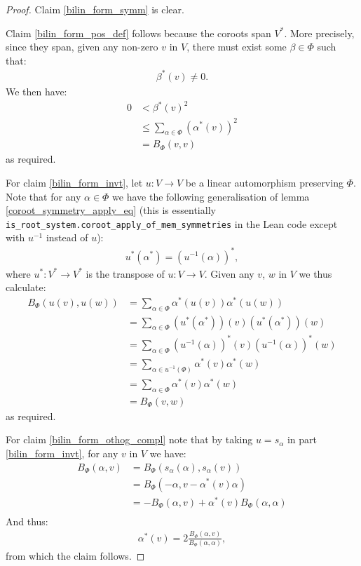 \documentclass[12pt, a4paper]{article}
\begin{document}
\begin{proof}
  Claim \eqref{bilin_form_symm} is clear.

  Claim \eqref{bilin_form_pos_def} follows because the coroots span $V^*$. More precisely, since
  they span, given any non-zero $v$ in $V$, there must exist some $\beta \in \Phi$ such that:
  \begin{align*}
    \beta^*(v) \ne 0.
  \end{align*}
  We then have:
  \begin{align*}
    0 &< \beta^*(v)^2\\
      &\le \sum_{\alpha \in \Phi}(\alpha^*(v))^2\\
      &= B_\Phi(v, v)
  \end{align*}
  as required.

  For claim \eqref{bilin_form_invt}, let $u : V \to V$ be a linear automorphism preserving $\Phi$.
  Note that for any $\alpha \in \Phi$ we have the following generalisation of lemma
  \ref{coroot_symmetry_apply_eq} (this is essentially
  \texttt{is\_root\_system.coroot\_apply\_of\_mem\_symmetries} in the Lean code except with $u^{-1}$
  instead of $u$):
  \begin{align*}
    u^*(\alpha^*) = (u^{-1}(\alpha))^*,
  \end{align*}
  where $u^* : V^* \to V^*$ is the transpose of $u : V \to V$. Given any $v$, $w$ in $V$ we thus
  calculate:
  \begin{align*}
    B_\Phi(u(v), u(w)) &= \sum_{\alpha \in \Phi}\alpha^*(u(v))\alpha^*(u(w))\\
                       &= \sum_{\alpha \in \Phi}(u^*(\alpha^*))(v)(u^*(\alpha^*))(w)\\
                       &= \sum_{\alpha \in \Phi}(u^{-1}(\alpha))^*(v)(u^{-1}(\alpha))^*(w)\\
                       &= \sum_{\alpha \in u^{-1}(\Phi)}\alpha^*(v)\alpha^*(w)\\
                       &= \sum_{\alpha \in \Phi}\alpha^*(v)\alpha^*(w)\\
                       &= B_\Phi(v, w)
  \end{align*}
  as required.

  For claim \eqref{bilin_form_othog_compl} note that by taking $u = s_\alpha$ in part
  \eqref{bilin_form_invt}, for any $v$ in $V$ we have:
  \begin{align*}
    B_\Phi(\alpha, v) &= B_\Phi(s_\alpha(\alpha), s_\alpha(v))\\
                      &= B_\Phi(-\alpha, v - \alpha^*(v)\alpha)\\
                      &= -B_\Phi(\alpha, v) + \alpha^*(v)B_\Phi(\alpha, \alpha)\\
  \end{align*}
  And thus:
  \begin{align*}
    \alpha^*(v) = 2\frac{B_\Phi(\alpha, v)}{B_\Phi(\alpha, \alpha)},
  \end{align*}
  from which the claim follows.
\end{proof}
\end{document}
